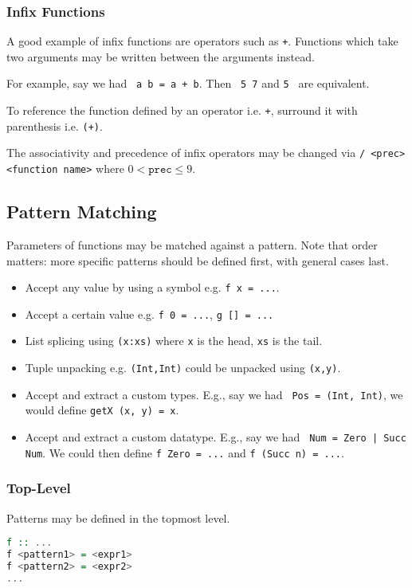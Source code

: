 \subsubsection{Infix Functions}

A good example of infix functions are operators such as \texttt{+}. Functions which take two arguments may be written between the arguments instead.

For example, say we had \texttt{ a b = a + b}. Then \texttt{ 5 7} and \texttt{5 \;\textasciigrave{}\textasciigrave{}} are equivalent.

To reference the function defined by an operator i.e. \texttt{+}, surround it with parenthesis i.e. \texttt{(+)}.

The associativity and precedence of infix operators may be changed via \texttt{/ <prec> <function name>} where $0 < \texttt{prec} \le 9$.

\subsection{Pattern Matching}

Parameters of functions may be matched against a pattern. Note that order matters: more specific patterns should be defined first, with general cases last.
\begin{itemize}
  \item Accept any value by using a symbol e.g. \texttt{f x = ...}.
  \item Accept a certain value e.g. \texttt{f 0 = ...}, \texttt{g [] = ...}
  \item List splicing using \texttt{(x:xs)} where \texttt{x} is the head, \texttt{xs} is the tail.
  \item Tuple unpacking e.g. \texttt{(Int,Int)} could be unpacked using \texttt{(x,y)}.
  \item Accept and extract a custom types. E.g., say we had \texttt{ Pos = (Int, Int)}, we would define \texttt{getX (x, y) = x}.
  \item Accept and extract a custom datatype. E.g., say we had \texttt{ Num = Zero | Succ Num}. We could then define \texttt{f Zero = ...} and \texttt{f (Succ n) = ...}.
\end{itemize}

\subsubsection{Top-Level}
Patterns may be defined in the topmost level.
\begin{lstlisting}[language=haskell]
f :: ...
f <pattern1> = <expr1>
f <pattern2> = <expr2>
...
\end{lstlisting}

